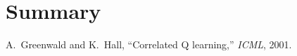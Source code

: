 \documentclass[conference]{IEEEtran}
\begin{document}
\section*{Summary}
\begin{thebibliography}{1}
A.~Greenwald and K.~Hall, ``Correlated Q learning,'' {\em ICML}, 2001.
\end{thebibliography}
\end{document}
